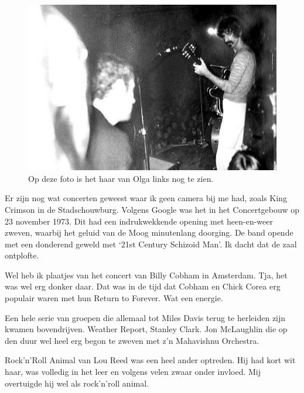 \documentclass[10pt,twoside, openright]{memoir}
\begin{document}
\begin{figure}
\includegraphics[width=\textwidth]{img/ch31/zappaolga}
\caption*{\footnotesize Op deze foto is het haar van Olga links nog te zien.}
\end{figure}

Er zijn nog wat concerten geweest waar ik geen camera bij me had, zoals King Crimson in de Stadschouwburg. Volgens Google was het in het Concertgebouw op 23 november 1973. Dit had een indrukwekkende opening met heen-en-weer zweven, waarbij het geluid van de Moog minutenlang doorging. De band opende met een donderend geweld met `21st Century Schizoid Man'. Ik dacht dat de zaal ontplofte.

Wel heb ik plaatjes van het concert van Billy Cobham in Amsterdam. Tja, het was wel erg donker daar. Dat was in de tijd dat Cobham en Chick Corea erg populair waren met hun Return to Forever. Wat een energie. 

Een hele serie van groepen die allemaal tot Miles Davis terug te herleiden zijn kwamen bovendrijven. Weather Report, Stanley Clark. Jon McLaughlin die op den duur wel heel erg begon te zweven met z’n Mahavishnu Orchestra.

Rock'n'Roll Animal van Lou Reed was een heel ander optreden. Hij had kort wit haar, was volledig in het leer en volgens velen zwaar onder invloed. Mij overtuigde hij wel als rock'n'roll animal.
\end{document}
